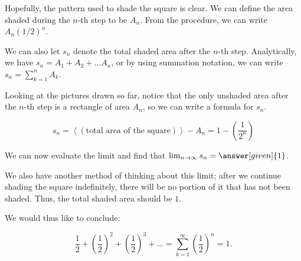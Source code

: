 \documentclass{ximera}
\begin{document}
% 
% 
%   
%

\vspace{3mm}

Hopefully, the pattern used to shade the square is clear.  We can define the area  shaded during the $n$-th step to be $A_n$.  From the procedure, we can write $A_n(1/2)^n$.

We can also let $s_n$ denote the total shaded area after the $n$-th step.  Analytically, we have $s_n = A_1+A_2 + \ldots A_n$, or by using summation notation, we can write $\displaystyle s_n = \sum_{k=1}^n A_k$.

Looking at the pictures drawn so far, notice that the only unshaded area after the $n$-th step is a rectangle of area $A_n$, so we can write a formula for $s_n$.   

\[
s_n = \left<(\textrm{total area of the square})\right>-A_n = 1-\left(\frac{1}{2^n}\right)
\]

We can now evaluate the limit and find that $\lim_{n \to \infty} s_n =\answer[given]{1}$.

We also have another method of thinking about this limit; after we continue shading the square indefinitely, there will be no portion of it that has not been shaded.  Thus, the total shaded area should be $1$.

We would thus like to conclude:

\[
\frac{1}{2} + \left(\frac{1}{2}\right)^2+ \left(\frac{1}{2}\right)^3+ \ldots = \sum_{k=1}^{\infty} \left(\frac{1}{2}\right)^n =1.
\]
\end{document}
